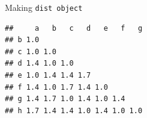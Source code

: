 \documentclass[ignorenonframetext,]{beamer}
\newenvironment{Shaded}{\begin{snugshade}}{\end{snugshade}}
\newcommand{\DecValTok}[1]{\textcolor[rgb]{0.00,0.00,0.81}{#1}}
\newcommand{\KeywordTok}[1]{\textcolor[rgb]{0.13,0.29,0.53}{\textbf{#1}}}
\newcommand{\NormalTok}[1]{#1}
\newcommand{\OperatorTok}[1]{\textcolor[rgb]{0.81,0.36,0.00}{\textbf{#1}}}
\newcommand{\StringTok}[1]{\textcolor[rgb]{0.31,0.60,0.02}{#1}}
\begin{document}
\begin{frame}[fragile]{Making \texttt{dist\ object}}
\protect\hypertarget{making-dist-object}{}

\begin{Shaded}
\end{Shaded}

\begin{verbatim}
##     a   b   c   d   e   f   g
## b 1.0                        
## c 1.0 1.0                    
## d 1.4 1.0 1.0                
## e 1.0 1.4 1.4 1.7            
## f 1.4 1.0 1.7 1.4 1.0        
## g 1.4 1.7 1.0 1.4 1.0 1.4    
## h 1.7 1.4 1.4 1.0 1.4 1.0 1.0
\end{verbatim}

\end{frame}
\end{document}

